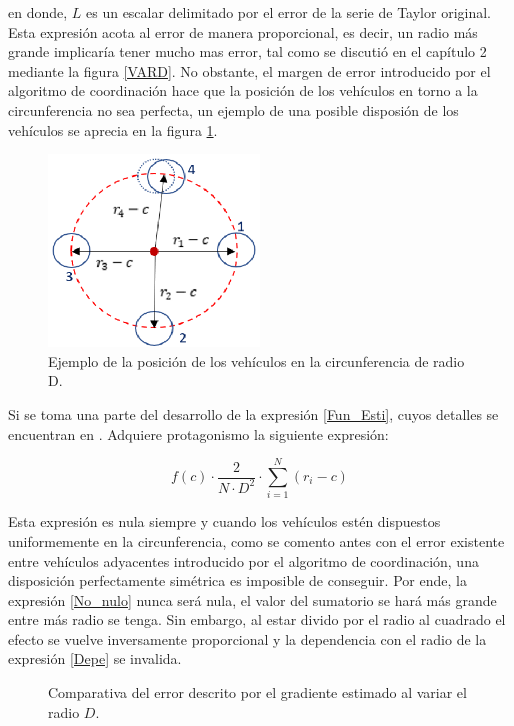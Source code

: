 en donde, $L$ es un escalar delimitado por el error de la serie de Taylor original. Esta expresión acota al error de manera proporcional, es decir, un radio más grande implicaría tener mucho mas error, tal como se discutió en el capítulo 2 mediante la figura \ref{VARD}. No obstante, el margen de error introducido por el algoritmo de coordinación hace que la posición de los vehículos en torno a la circunferencia no sea perfecta, un ejemplo de una posible disposión de los vehículos se aprecia en la figura \ref{Grafo_Nuevo}.

\begin{figure}[H]
\centering
\includegraphics[width=0.50\textwidth]{figures/New_Grafo.eps}
\caption{Ejemplo de la posición de los vehículos en la circunferencia de radio D.} \label{Grafo_Nuevo}
\end{figure}

Si se toma una parte del desarrollo de la expresión \ref{Fun_Esti}, cuyos detalles se encuentran en \cite{Estimacion_Gradiente}. Adquiere protagonismo la siguiente expresión:

\begin{equation} \label{No_nulo} 
	f\left(c\right)\cdot\frac{2}{N\cdot{D}^2}\cdot\sum_{i=1}^{N}\left(r_{i}-c\right)
\end{equation}

Esta expresión es nula siempre y cuando los vehículos estén dispuestos uniformemente en la circunferencia, como se comento antes con el error existente entre vehículos adyacentes introducido por el algoritmo de coordinación, una disposición perfectamente simétrica es imposible de conseguir. Por ende, la expresión \ref{No_nulo} nunca será nula, el valor del sumatorio se hará más grande entre más radio se tenga. Sin embargo, al estar divido por el radio al cuadrado el efecto se vuelve inversamente proporcional y la dependencia con el radio de la expresión \ref{Depe} se invalida.

\begin{figure}[H]
  \begin{center}
    \caption{Comparativa del error descrito por el gradiente estimado al variar el radio $D$.}
    \label{D_Var_Error}
  \end{center}
\end{figure}

